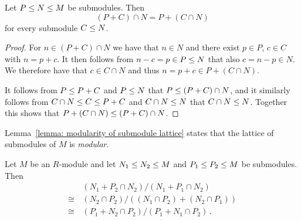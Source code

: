 \begin{lemma}
  \label{lemma: modularity of submodule lattice}
  Let $P \leq N \leq M$ be submodules.
  Then
  \[
      (P + C) \cap N
    = P + (C \cap N)
  \]
  for every submodule $C \leq N$.
\end{lemma}


\begin{proof}
  For $n \in (P + C) \cap N$ we have that $n \in N$ and there exist $p \in P$, $c \in C$ with $n = p + c$.
  It then follows from $n - c = p \in P \leq N$ that also $c = n - p \in N$.
  We therefore have that $c \in C \cap N$ and thus $n = p + c \in P + (C \cap N)$.
  
  It follows from $P \leq P + C$ and $P \leq N$ that $P \leq (P + C) \cap N$, and it similarly follows from $C \cap N \leq C \leq P + C$ and $C \cap N \leq N$ that $C \cap N \leq N$.
  Together this shows that $P + (C \cap N) \leq (P + C) \cap N$.
\end{proof}


\begin{remark}
  Lemma~\ref{lemma: modularity of submodule lattice} states that the lattice of submodules of $M$ is \emph{modular}.
\end{remark}


\begin{lemma}
  \label{lemma: butterfly lemma}
  Let $M$ be an $R$-module and let $N_1 \leq N_2 \leq M$ and $P_1 \leq P_2 \leq M$ be submodules.
  Then
  \begin{align*}
         &\,  (N_1 + P_2 \cap N_2)/(N_1 + P_1 \cap N_2)         \\
    \cong&\,  (N_2 \cap P_2)/((N_1 \cap P_2) + (N_2 \cap P_1))  \\
    \cong&\,  (P_1 + N_2 \cap P_2)/(P_1 + N_1 \cap P_2) \,.
  \end{align*}
\end{lemma}


